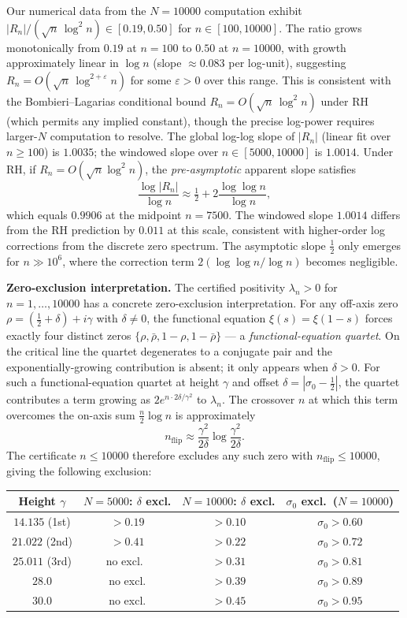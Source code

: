 \documentclass[11pt]{article}
\begin{document}
Our numerical data from the $N = 10000$ computation exhibit
$|R_n|/(\sqrt{n}\,\log^2 n) \in [0.19, 0.50]$ for $n \in [100, 10000]$.
The ratio grows monotonically from $0.19$ at $n=100$ to $0.50$ at $n=10000$,
with growth approximately linear in $\log n$ (slope $\approx 0.083$ per log-unit),
suggesting $R_n = O(\sqrt{n}\,\log^{2+\varepsilon} n)$ for some $\varepsilon > 0$
over this range. This is consistent with the Bombieri--Lagarias conditional bound $R_n = O(\sqrt{n}\,\log^2 n)$
under RH (which permits any implied constant), though the precise log-power
requires larger-$N$ computation to resolve.
The global log-log slope of $|R_n|$ (linear fit over $n \ge 100$) is $1.0035$;
the windowed slope over $n \in [5000, 10000]$ is $1.0014$.
Under RH, if $R_n = O(\sqrt{n}\log^2 n)$, the \emph{pre-asymptotic} apparent slope satisfies
\[
  \frac{\log|R_n|}{\log n} \approx \tfrac{1}{2} + 2\frac{\log\log n}{\log n},
\]
which equals $0.9906$ at the midpoint $n = 7500$. The windowed slope $1.0014$
differs from the RH prediction by $0.011$ at this scale, consistent with
higher-order log corrections from the discrete zero spectrum.
The asymptotic slope $\tfrac{1}{2}$ only emerges for $n \gg 10^6$,
where the correction term $2(\log\log n / \log n)$ becomes negligible.

\textbf{Zero-exclusion interpretation.}
The certified positivity $\lambda_n > 0$ for $n = 1, \ldots, 10000$ has a concrete
zero-exclusion interpretation. For any off-axis zero $\rho = (\tfrac{1}{2}+\delta)+i\gamma$
with $\delta \ne 0$, the functional equation $\xi(s)=\xi(1-s)$ forces exactly four
distinct zeros $\{\rho, \bar\rho, 1-\rho, 1-\bar\rho\}$ --- a \emph{functional-equation
quartet}. On the critical line the quartet degenerates to a conjugate pair and the
exponentially-growing contribution is absent; it only appears when $\delta>0$.
For such a functional-equation quartet at height $\gamma$ and offset
$\delta = |\sigma_0 - \tfrac{1}{2}|$, the quartet
contributes a term growing as $2e^{n \cdot 2\delta/\gamma^2}$ to $\lambda_n$.
The crossover $n$ at which this term overcomes the on-axis sum $\tfrac{n}{2}\log n$
is approximately
\[
  n_{\mathrm{flip}} \approx \frac{\gamma^2}{2\delta} \log\!\frac{\gamma^2}{2\delta}.
\]
The certificate $n \le 10000$ therefore excludes any such zero with
$n_{\mathrm{flip}} \le 10000$, giving the following exclusion:

\begin{center}
\begin{tabular}{cccc}
\toprule
Height $\gamma$ & $N=5000$: $\delta$ excl. & $N=10000$: $\delta$ excl. & $\sigma_0$ excl.\ ($N=10000$) \\
\midrule
$14.135$ (1st) & $>0.19$ & $>0.10$ & $\sigma_0 > 0.60$ \\
$21.022$ (2nd) & $>0.41$ & $>0.22$ & $\sigma_0 > 0.72$ \\
$25.011$ (3rd) & no excl.\ & $>0.31$ & $\sigma_0 > 0.81$ \\
$28.0$         & no excl. & $>0.39$ & $\sigma_0 > 0.89$ \\
$30.0$         & no excl. & $>0.45$ & $\sigma_0 > 0.95$ \\
\bottomrule
\end{tabular}
\end{center}
\end{document}
